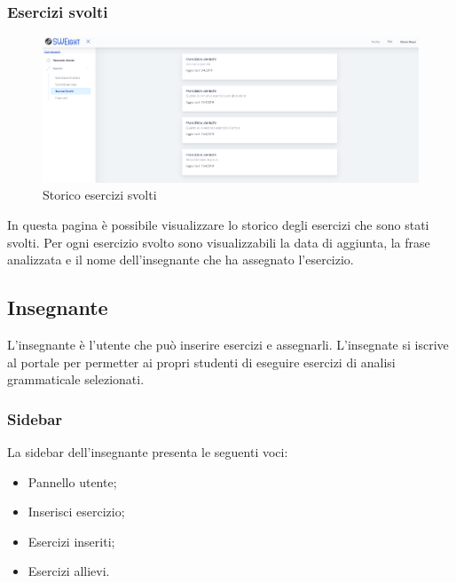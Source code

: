         
        
        \subsubsection{Esercizi svolti}
        	\begin{figure}[H]
            	\centering
            	\includegraphics[width=17cm]{sez/img/studente/esercizisvolti.PNG} 
            	\caption{Storico esercizi svolti}\label{fig:1}
        	\end{figure}
          In questa pagina è possibile visualizzare lo storico degli esercizi che sono stati svolti. Per ogni esercizio svolto sono visualizzabili la data di aggiunta, la frase analizzata e il nome dell'insegnante che ha assegnato l'esercizio.
        
\newpage
    \subsection{Insegnante}
      L'insegnante è l'utente che può inserire esercizi e assegnarli. L'insegnate si iscrive al portale per permetter ai propri studenti di eseguire esercizi di analisi grammaticale selezionati.
        \subsubsection{Sidebar}
          La sidebar dell'insegnante presenta le seguenti voci:
        	\begin{itemize}
            	\item Pannello utente;
            	\item Inserisci esercizio;
            	\item Esercizi inseriti;
            	\item Esercizi allievi.
        	\end{itemize}
        
        
        
